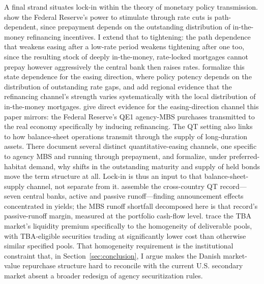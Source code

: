 \documentclass[12pt]{article}
\begin{document}
A final strand situates lock-in within the theory of monetary policy transmission. \citet{berger2021} show the Federal Reserve's power to stimulate through rate cuts is path-dependent, since prepayment depends on the outstanding distribution of in-the-money refinancing incentives. I extend that to tightening: the path dependence that weakens easing after a low-rate period weakens tightening after one too, since the resulting stock of deeply in-the-money, rate-locked mortgages cannot prepay however aggressively the central bank then raises rates. \citet{eichenbaum2022} formalize this state dependence for the easing direction, where policy potency depends on the distribution of outstanding rate gaps, and \citet{beraja2019} add regional evidence that the refinancing channel's strength varies systematically with the local distribution of in-the-money mortgages. \citet{dimaggio2020} give direct evidence for the easing-direction channel this paper mirrors: the Federal Reserve's QE1 agency-MBS purchases transmitted to the real economy specifically by inducing refinancing. The QT setting also links to how balance-sheet operations transmit through the supply of long-duration assets. There \citet{krishnamurthy2011} document several distinct quantitative-easing channels, one specific to agency MBS and running through prepayment, and \citet{vayanos2021} formalize, under preferred-habitat demand, why shifts in the outstanding maturity and supply of held bonds move the term structure at all. Lock-in is thus an input to that balance-sheet-supply channel, not separate from it. \citet{du2024} assemble the cross-country QT record---seven central banks, active and passive runoff---finding announcement effects concentrated in yields; the MBS runoff shortfall decomposed here is that record's passive-runoff margin, measured at the portfolio cash-flow level. \citet{vickery2013} trace the TBA market's liquidity premium specifically to the homogeneity of deliverable pools, with TBA-eligible securities trading at significantly lower cost than otherwise similar specified pools. That homogeneity requirement is the institutional constraint that, in Section~\ref{sec:conclusion}, I argue makes the Danish market-value repurchase structure hard to reconcile with the current U.S. secondary market absent a broader redesign of agency securitization rules.
\end{document}
